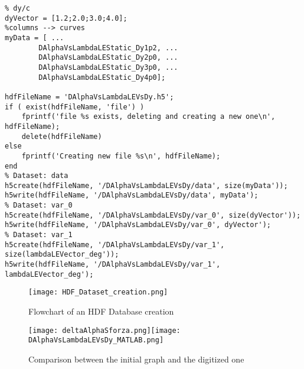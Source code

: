 \begin{lstlisting}[caption={MATLAB script for creating the HDF Database}, captionpos=t, tabsize=2]
%% preparing output to HDF
% dy/c
dyVector = [1.2;2.0;3.0;4.0];
%columns --> curves
myData = [ ...
        DAlphaVsLambdaLEStatic_Dy1p2, ...
        DAlphaVsLambdaLEStatic_Dy2p0, ...
        DAlphaVsLambdaLEStatic_Dy3p0, ... 
        DAlphaVsLambdaLEStatic_Dy4p0];   

hdfFileName = 'DAlphaVsLambdaLEVsDy.h5';
if ( exist(hdfFileName, 'file') )
    fprintf('file %s exists, deleting and creating a new one\n', hdfFileName);
    delete(hdfFileName)
else
    fprintf('Creating new file %s\n', hdfFileName);
end
% Dataset: data
h5create(hdfFileName, '/DAlphaVsLambdaLEVsDy/data', size(myData'));
h5write(hdfFileName, '/DAlphaVsLambdaLEVsDy/data', myData');
% Dataset: var_0
h5create(hdfFileName, '/DAlphaVsLambdaLEVsDy/var_0', size(dyVector'));
h5write(hdfFileName, '/DAlphaVsLambdaLEVsDy/var_0', dyVector');
% Dataset: var_1
h5create(hdfFileName, '/DAlphaVsLambdaLEVsDy/var_1', size(lambdaLEVector_deg'));
h5write(hdfFileName, '/DAlphaVsLambdaLEVsDy/var_1', lambdaLEVector_deg');
\end{lstlisting}

\bigskip
\begin{figure}[!hb]
\centering
\texttt{[image: HDF\_Dataset\_creation.png]}
\caption{Flowchart of an HDF Database creation}
\end{figure}
%
\clearpage
\begin{figure}
\centering
\texttt{[image: deltaAlphaSforza.png]}\texttt{[image: DAlphaVsLambdaLEVsDy\_MATLAB.png]}
\caption{Comparison between the initial graph and the digitized one}
\label{fig:DeltaAlphaMaxClean}
\end{figure}
%
